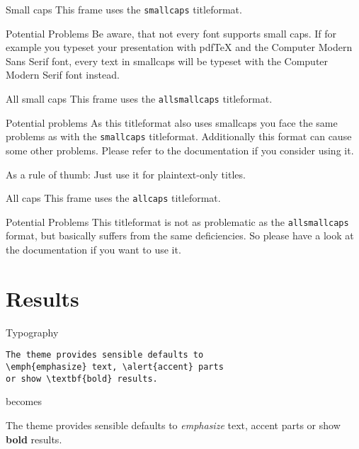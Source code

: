 \documentclass[10pt]{beamer}
\begin{document}
{
\begin{frame}{Small caps}
  This frame uses the \texttt{smallcaps} titleformat.

  \begin{alertblock}{Potential Problems}
    Be aware, that not every font supports small caps. If for example you typeset your presentation with pdfTeX and the Computer Modern Sans Serif font, every text in smallcaps will be typeset with the Computer Modern Serif font instead.
  \end{alertblock}
\end{frame}
}

{
\begin{frame}{All small caps}
  This frame uses the \texttt{allsmallcaps} titleformat.

  \begin{alertblock}{Potential problems}
    As this titleformat also uses smallcaps you face the same problems as with the \texttt{smallcaps} titleformat. Additionally this format can cause some other problems. Please refer to the documentation if you consider using it.

    As a rule of thumb: Just use it for plaintext-only titles.
  \end{alertblock}
\end{frame}
}

{
\begin{frame}{All caps}
  This frame uses the \texttt{allcaps} titleformat.

  \begin{alertblock}{Potential Problems}
    This titleformat is not as problematic as the \texttt{allsmallcaps} format, but basically suffers from the same deficiencies. So please have a look at the documentation if you want to use it.
  \end{alertblock}
\end{frame}
}

\section{Results}

\begin{frame}[fragile]{Typography}
      \begin{verbatim}The theme provides sensible defaults to
\emph{emphasize} text, \alert{accent} parts
or show \textbf{bold} results.\end{verbatim}

  \begin{center}becomes\end{center}

  The theme provides sensible defaults to \emph{emphasize} text,
  \alert{accent} parts or show \textbf{bold} results.
\end{frame}
\end{document}
